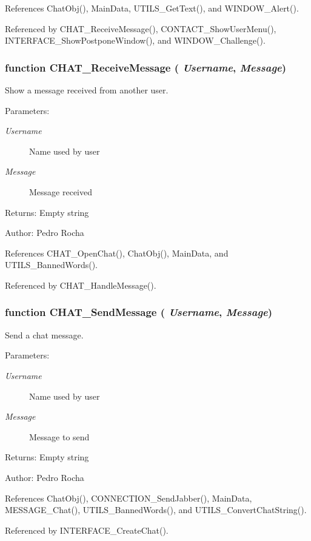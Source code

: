 References ChatObj(), MainData, UTILS\_\-GetText(), and WINDOW\_\-Alert().

Referenced by CHAT\_\-ReceiveMessage(), CONTACT\_\-ShowUserMenu(), INTERFACE\_\-ShowPostponeWindow(), and WINDOW\_\-Challenge().
\subsubsection[CHAT\_\-ReceiveMessage]{\setlength{\rightskip}{0pt plus 5cm}function CHAT\_\-ReceiveMessage ( {\em Username}, \/   {\em Message})}\label{chat_2chat_8js_7f659442a1884818e52eb2d1a23022dd}


Show a message received from another user. 

\begin{Desc}
\item[Parameters:]
\begin{description}
\item[{\em Username}]Name used by user \item[{\em Message}]Message received \end{description}
\end{Desc}
\begin{Desc}
\item[Returns:]Empty string \end{Desc}
\begin{Desc}
\item[Author:]Pedro Rocha \end{Desc}


References CHAT\_\-OpenChat(), ChatObj(), MainData, and UTILS\_\-BannedWords().

Referenced by CHAT\_\-HandleMessage().
\subsubsection[CHAT\_\-SendMessage]{\setlength{\rightskip}{0pt plus 5cm}function CHAT\_\-SendMessage ( {\em Username}, \/   {\em Message})}\label{chat_2chat_8js_ca2bf1915cb3b4cd64d41f6e8f229982}


Send a chat message. 

\begin{Desc}
\item[Parameters:]
\begin{description}
\item[{\em Username}]Name used by user \item[{\em Message}]Message to send \end{description}
\end{Desc}
\begin{Desc}
\item[Returns:]Empty string \end{Desc}
\begin{Desc}
\item[Author:]Pedro Rocha \end{Desc}


References ChatObj(), CONNECTION\_\-SendJabber(), MainData, MESSAGE\_\-Chat(), UTILS\_\-BannedWords(), and UTILS\_\-ConvertChatString().

Referenced by INTERFACE\_\-CreateChat().
